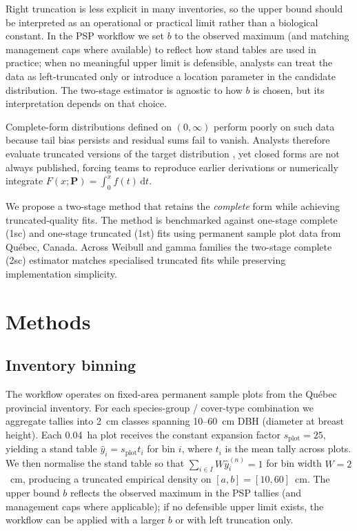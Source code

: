\documentclass[12pt]{article}
\begin{document}
Right truncation is less explicit in many inventories, so the upper bound should be interpreted as an operational or practical limit rather than a biological constant. In the PSP workflow we set $b$ to the observed maximum (and matching management caps where available) to reflect how stand tables are used in practice; when no meaningful upper limit is defensible, analysts can treat the data as left-truncated only or introduce a location parameter in the candidate distribution. The two-stage estimator is agnostic to how $b$ is chosen, but its interpretation depends on that choice.

Complete-form distributions defined on $(0, \infty)$ perform poorly on such data because tail bias persists and residual sums fail to vanish. Analysts therefore evaluate truncated versions of the target distribution \citep{zutter1986characterizing}, yet closed forms are not always published, forcing teams to reproduce earlier derivations \citep{mittal1989estimating, hannon1999estimation, hegde1989estimation, ahmad2001moments, wingo1989left} or numerically integrate $F(x; \boldsymbol{P}) = \int_0^x f(t)\,\mathrm{d}t$.

We propose a two-stage method that retains the \emph{complete} form while achieving truncated-quality fits. The method is benchmarked against one-stage complete (1sc) and one-stage truncated (1st) fits using permanent sample plot data from Qu\'ebec, Canada. Across Weibull and gamma families the two-stage complete (2sc) estimator matches specialised truncated fits while preserving implementation simplicity.

\section{Methods}
\label{sec:methods}

\subsection{Inventory binning}
\label{sec:methods_binning}

The workflow operates on fixed-area permanent sample plots from the Qu\'ebec provincial inventory. For each species-group / cover-type combination we aggregate tallies into 2~cm classes spanning 10--60~cm DBH (diameter at breast height). Each 0.04~ha plot receives the constant expansion factor $s_{\text{plot}} = 25$, yielding a stand table $\hat{y}_i = s_{\text{plot}} t_i$ for bin $i$, where $t_i$ is the mean tally across plots. We then normalise the stand table so that $\sum_{i \in I} W \hat{y}_i^{(n)} = 1$ for bin width $W = 2$~cm, producing a truncated empirical density on $[a, b] = [10, 60]$~cm.
The upper bound $b$ reflects the observed maximum in the PSP tallies (and management caps where applicable); if no defensible upper limit exists, the workflow can be applied with a larger $b$ or with left truncation only.
\end{document}
